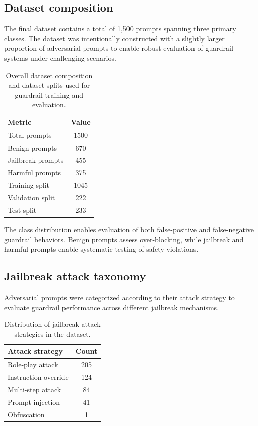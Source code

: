 \documentclass[11pt]{article}
\begin{document}

\subsection{Dataset composition}

The final dataset contains a total of 1,500 prompts spanning three primary classes. The dataset was intentionally constructed with a slightly larger proportion of adversarial prompts to enable robust evaluation of guardrail systems under challenging scenarios.

\begin{table}[h]
\centering
\begin{tabular}{lc}
\toprule
Metric & Value \\
\midrule
Total prompts & 1500 \\
Benign prompts & 670 \\
Jailbreak prompts & 455 \\
Harmful prompts & 375 \\
Training split & 1045 \\
Validation split & 222 \\
Test split & 233 \\
\bottomrule
\end{tabular}
\caption{Overall dataset composition and dataset splits used for guardrail training and evaluation.}
\label{tab:dataset_summary}
\end{table}

The class distribution enables evaluation of both false-positive and false-negative guardrail behaviors. Benign prompts assess over-blocking, while jailbreak and harmful prompts enable systematic testing of safety violations.


\subsection{Jailbreak attack taxonomy}

Adversarial prompts were categorized according to their attack strategy to evaluate guardrail performance across different jailbreak mechanisms.

\begin{table}[h]
\centering
\begin{tabular}{lc}
\toprule
Attack strategy & Count \\
\midrule
Role-play attack & 205 \\
Instruction override & 124 \\
Multi-step attack & 84 \\
Prompt injection & 41 \\
Obfuscation & 1 \\
\bottomrule
\end{tabular}
\caption{Distribution of jailbreak attack strategies in the dataset.}
\label{tab:attack_taxonomy}
\end{table}
\end{document}

